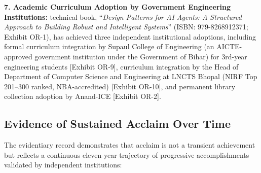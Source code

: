 \textbf{7. Academic Curriculum Adoption by Government Engineering Institutions:} \drs technical book, ``\textit{Design Patterns for AI Agents: A Structured Approach to Building Robust and Intelligent Systems}'' (ISBN: 979-8268912371; Exhibit OR-1), has achieved three independent institutional adoptions, including formal curriculum integration by Supaul College of Engineering (an AICTE-approved government institution under the Government of Bihar) for 3rd-year engineering students [Exhibit OR-9], curriculum integration by the Head of Department of Computer Science and Engineering at LNCTS Bhopal (NIRF Top 201--300 ranked, NBA-accredited) [Exhibit OR-10], and permanent library collection adoption by Anand-ICE [Exhibit OR-2].

\subsection{Evidence of Sustained Acclaim Over Time}
\label{finalmerits:sustained}

The evidentiary record demonstrates that \drs acclaim is not a transient achievement but reflects a continuous eleven-year trajectory of progressive accomplishments validated by independent institutions:

